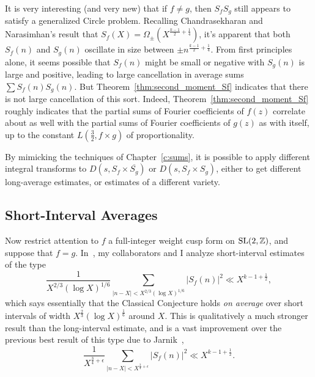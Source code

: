 It is very interesting (and very new) that if $f \neq g$, then $S_f S_g$ still appears to
satisfy a generalized Circle problem.
Recalling Chandrasekharan and Narasimhan's result that $S_f(X) =
\Omega_{\pm}(X^{\frac{k-1}{2} + \frac{1}{4}})$, it's apparent that both $S_f(n)$ and
$S_g(n)$ oscillate in size between $\pm n^{\frac{k-1}{2} + \frac{1}{4}}$.
From first principles alone, it seems possible that $S_f(n)$ might be small or negative
with $S_g(n)$ is large and positive, leading to large cancellation in average sums $\sum
S_f(n) S_g(n)$.
But Theorem~\ref{thm:second_moment_Sf} indicates that there is not large cancellation of
this sort.
Indeed, Theorem~\ref{thm:second_moment_Sf} roughly indicates that the partial sums of
Fourier coefficients of $f(z)$ correlate about as well with the partial sums of Fourier
coefficients of $g(z)$ as with itself, up to the constant $L(\frac{3}{2}, f \times g)$ of
proportionality.


By mimicking the techniques of Chapter~\ref{c:sums}, it is possible to apply different
integral transforms to $D(s, S_f \times \overline{S_g})$ or $D(s, S_f \times S_g)$, either
to get different long-average estimates, or estimates of a different variety.



\subsection*{Short-Interval Averages}


Now restrict attention to $f$ a full-integer weight cusp form on $\operatorname{SL}(2, \mathbb{Z})$, and
suppose that $f = g$.
In~\cite{hkldwShort}, my collaborators and I analyze short-interval estimates of the type
\begin{equation}\label{eq:short-interval-estimate}
  \frac{1}{X^{2/3}(\log X)^{1/6}} \sum_{\lvert n-X \rvert < X^{2/3} (\log X)^{1/6}} \lvert
  S_f(n) \rvert^2 \ll X^{k-1 + \frac{1}{2}},
\end{equation}
which says essentially that the Classical Conjecture holds \emph{on average} over short
intervals of width $X^{\frac{2}{3}} (\log X)^{\frac{1}{6}}$ around $X$.
This is qualitatively a  much stronger result than the long-interval estimate, and is a
vast improvement over the previous best result of this type due to
Jarnik~\cite{jutila1987lectures},
\begin{equation}
  \frac{1}{X^{\frac{3}{4} + \epsilon}} \sum_{\lvert n - X \rvert < X^{\frac{3}{4} +
  \epsilon}} \lvert S_f(n) \rvert^2 \ll X^{k - 1 + \frac{1}{2}}.
\end{equation}



